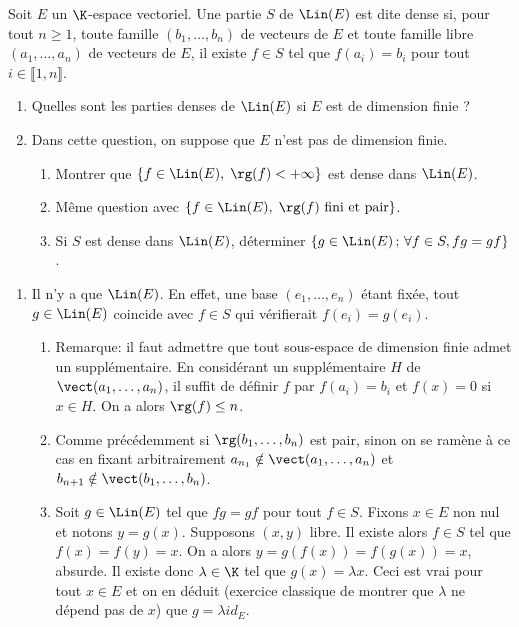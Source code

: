 \begin{enonce}
\begin{exercise}[ID={RMS134 E576},subtitle={Oral
    Mines-Ponts},theme={algebre},annee={2023},concours={mines-ponts},filiere={MP}]
Soit $E$ un $\K$-espace vectoriel. Une partie $S$ de $\Lin(E)$ est
dite dense si, pour tout $n\ge 1$, toute famille $(b_1,\ldots,b_n)$ de
vecteurs de $E$ et toute famille libre $(a_1,\ldots,a_n)$ de vecteurs
de $E$, il existe $f\in S$ tel que $f(a_i)=b_i$ pour tout
$i\in\llbracket 1,n\rrbracket$.
\begin{enumerate}
\item Quelles sont les parties denses de $\Lin(E)$ si $E$ est de
  dimension finie ?
\item Dans cette question, on suppose que $E$ n'est pas de dimension
  finie.
  \begin{enumerate}
  \item Montrer que $\{f\in\Lin(E),\; \rg(f)< +\infty\}$ est dense dans
    $\Lin(E)$.
  \item Même question avec $\{f\in\Lin(E),\; \rg(f)\text{ fini et
      pair}\}$.
  \item Si $S$ est dense dans $\Lin(E)$, déterminer
    $\{g\in\Lin(E)\,;\,\forall f\in S, fg=gf\}$.
  \end{enumerate}
\end{enumerate}
\end{exercise}
\begin{solution}
  \begin{enumerate}
  \item Il n'y a que $\Lin(E)$. En effet, une base $(e_1,\ldots,e_n)$
    étant fixée, tout $g\in\Lin(E)$ coincide avec $f\in S$ qui
    vérifierait $f(e_i)=g(e_i)$.
    \begin{enumerate}
    \item Remarque: il faut admettre que tout sous-espace de dimension
      finie admet un supplémentaire. En considérant un supplémentaire
      $H$ de $\vect(a_1,\ldots,a_n)$, il suffit de définir $f$ par
      $f(a_i)=b_i$ et $f(x)=0$ si $x\in H$. On a alors $\rg(f)\le n$.
    \item Comme précédemment si $\rg(b_1,\ldots,b_n)$ est pair, sinon
      on se ramène à ce cas en fixant arbitrairement
      $a_{n_1}\notin\vect(a_1,\ldots,a_n)$ et
      $b_{n+1}\notin\vect(b_1,\ldots,b_n)$.
    \item Soit $g\in\Lin(E)$ tel que $fg=gf$ pour tout $f\in
      S$. Fixons $x\in E$ non nul et notons $y=g(x)$. Supposons
      $(x,y)$ libre. Il existe alors $f\in S$ tel que
      $f(x)=f(y)=x$. On a alors $y=g(f(x))=f(g(x))=x$, absurde. Il
      existe donc $\lambda\in\K$ tel que $g(x)=\lambda x$. Ceci est
      vrai pour tout $x\in E$ et on en déduit (exercice classique de
      montrer que $\lambda$ ne dépend pas de $x$) que $g=\lambda id_E$.
    \end{enumerate}
  \end{enumerate}
\end{solution}
\end{enonce}
